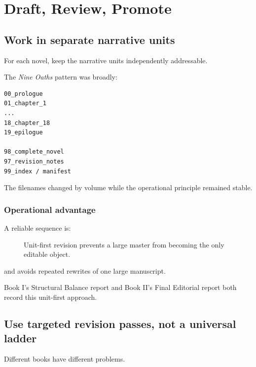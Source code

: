 \documentclass[11pt,oneside,openany]{book}
\begin{document}
\part{Draft, Review, Promote}

\chapter{Work in separate narrative units}\label{work-in-separate-narrative-units}

For each novel, keep the narrative units independently addressable.

The \emph{Nine Oaths} pattern was broadly:

\begin{lstlisting}
00_prologue
01_chapter_1
...
18_chapter_18
19_epilogue

98_complete_novel
97_revision_notes
99_index / manifest
\end{lstlisting}

The filenames changed by volume while the operational principle remained stable.

\section{Operational advantage}\label{operational-advantage}

A reliable sequence is:

\begin{figure}[htbp]
\centering
{}
\caption{Unit-first revision prevents a large master from becoming the only editable object.}
\end{figure}

and avoids repeated rewrites of one large manuscript.

Book I's Structural Balance report and Book II's Final Editorial report both record this unit-first approach.

\chapter{Use targeted revision passes, not a universal ladder}

Different books have different problems.
\end{document}
